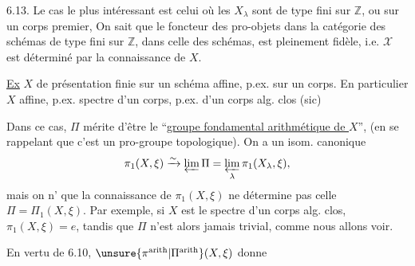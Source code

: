 6.13. Le cas le plus intéressant est celui où les $X_\lambda$ sont de type
 fini sur $\mathbb{Z}$, ou sur un corps
premier,  On sait que le foncteur
 des pro-objets dans la catégorie des schémas de type fini
sur $\mathbb{Z}$, dans celle des schémas, est pleinement fidèle, i.e.
$\mathscr{X}$ est déterminé par la connaissance de $X$.

\uline{Ex} $X$ de présentation finie sur un schéma affine, p.ex. sur un
corps. En particulier $X$ affine, p.ex.  spectre d'un
corps, p.ex. d'un corps alg. clos (sic)

Dans ce cas, $\Pi$ mérite d'être  le
``\uline{groupe fondamental arithmétique de $X$}'',
(en se rappelant que c'est un  pro-groupe topologique).
On a un isom. canonique
\[
\pi_1(X,\xi)\xrightarrow{\sim}\varprojlim\Pi
=\varprojlim_\lambda\pi_1(X_\lambda,\xi),
\]
mais on n' que la connaissance de $\pi_1(X,\xi)$ ne
détermine pas celle  
 $\Pi=\Pi_1(X,\xi)$.
Par exemple, si $X$ est le spectre d'un corps alg. clos,
$\pi_1(X,\xi)=e$, tandis que $\Pi$ n'est alors jamais trivial, comme
nous allons voir.

En vertu de 6.10, $\unsure{\pi^{\mathrm{arith}}|\Pi^{\mathrm{arith}}}(X,\xi)$
donne
